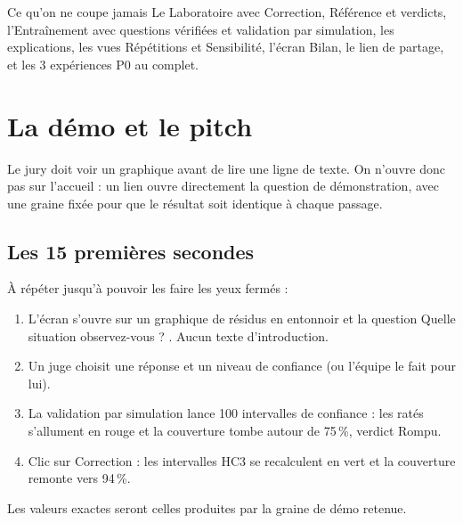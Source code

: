 \documentclass[11pt,a4paper]{article}
\begin{document}
\begin{okbox}{Ce qu'on ne coupe jamais}
Le Laboratoire avec Correction, Référence et verdicts, l'Entraînement avec questions vérifiées et validation par simulation, les explications, les vues Répétitions et Sensibilité, l'écran Bilan, le lien de partage, et les 3 expériences P0 au complet.
\end{okbox}

\section{La démo et le pitch}

\begin{enbref}
Le jury doit voir un graphique avant de lire une ligne de texte. On n'ouvre donc pas sur l'accueil : un lien ouvre directement la question de démonstration, avec une graine fixée pour que le résultat soit identique à chaque passage.
\end{enbref}

\subsection{Les 15 premières secondes}
À répéter jusqu'à pouvoir les faire les yeux fermés :
\begin{enumerate}[leftmargin=*, nosep]
  \item L'écran s'ouvre sur un graphique de résidus en entonnoir et la question \og Quelle situation observez-vous ? \fg{}. Aucun texte d'introduction.
  \item Un juge choisit une réponse et un niveau de confiance (ou l'équipe le fait pour lui).
  \item La validation par simulation lance 100 intervalles de confiance : les ratés s'allument en rouge et la couverture tombe autour de 75\,\%, verdict Rompu.
  \item Clic sur Correction : les intervalles HC3 se recalculent en vert et la couverture remonte vers 94\,\%.
\end{enumerate}
Les valeurs exactes seront celles produites par la graine de démo retenue.
\end{document}

